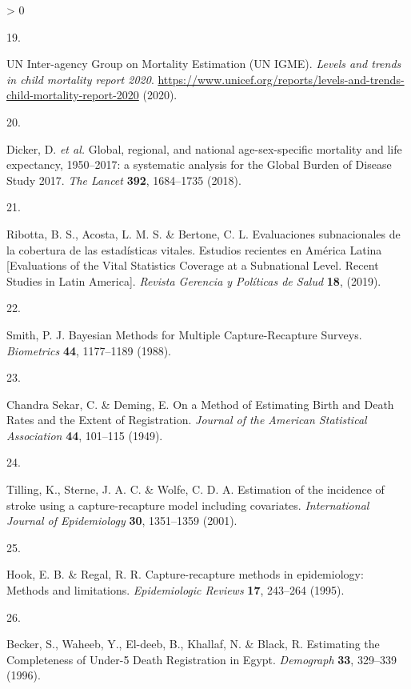 \documentclass[
]{article}
\newlength{\cslhangindent}
\newlength{\csllabelwidth}
\newenvironment{CSLReferences}[2] %
 {%
  \setlength{\parindent}{0pt}
  \ifodd #1 \everypar{\setlength{\hangindent}{\cslhangindent}}\ignorespaces\fi
  \ifnum #2 > 0
  \setlength{\parskip}{#2\baselineskip}
  \fi
 }%
 {}
\newcommand{\CSLLeftMargin}[1]{\parbox[t]{\csllabelwidth}{#1}}
\newcommand{\CSLRightInline}[1]{\parbox[t]{\linewidth - \csllabelwidth}{#1}\break}
\begin{document}
\begin{CSLReferences}{0}{0}
\leavevmode\hypertarget{ref-UNInter-agencyGrouponMortalityEstimationUNIGME2020}{}%
\CSLLeftMargin{19. }
\CSLRightInline{UN Inter-agency Group on Mortality Estimation (UN IGME). \emph{{Levels and trends in child mortality report 2020}}. \url{https://www.unicef.org/reports/levels-and-trends-child-mortality-report-2020} (2020).}

\leavevmode\hypertarget{ref-Dicker2018}{}%
\CSLLeftMargin{20. }
\CSLRightInline{Dicker, D. \emph{et al.} {Global, regional, and national age-sex-specific mortality and life expectancy, 1950--2017: a systematic analysis for the Global Burden of Disease Study 2017}. \emph{The Lancet} \textbf{392}, 1684--1735 (2018).}

\leavevmode\hypertarget{ref-Ribotta2019}{}%
\CSLLeftMargin{21. }
\CSLRightInline{Ribotta, B. S., Acosta, L. M. S. \& Bertone, C. L. {Evaluaciones subnacionales de la cobertura de las estad{í}sticas vitales. Estudios recientes en Am{é}rica Latina {[}Evaluations of the Vital Statistics Coverage at a Subnational Level. Recent Studies in Latin America{]}}. \emph{Revista Gerencia y Pol{í}ticas de Salud} \textbf{18}, (2019).}

\leavevmode\hypertarget{ref-Smith1988}{}%
\CSLLeftMargin{22. }
\CSLRightInline{Smith, P. J. {Bayesian Methods for Multiple Capture-Recapture Surveys}. \emph{Biometrics} \textbf{44}, 1177--1189 (1988).}

\leavevmode\hypertarget{ref-ChandraSekar1949}{}%
\CSLLeftMargin{23. }
\CSLRightInline{Chandra Sekar, C. \& Deming, E. {On a Method of Estimating Birth and Death Rates and the Extent of Registration}. \emph{Journal of the American Statistical Association} \textbf{44}, 101--115 (1949).}

\leavevmode\hypertarget{ref-Tilling2001a}{}%
\CSLLeftMargin{24. }
\CSLRightInline{Tilling, K., Sterne, J. A. C. \& Wolfe, C. D. A. {Estimation of the incidence of stroke using a capture-recapture model including covariates}. \emph{International Journal of Epidemiology} \textbf{30}, 1351--1359 (2001).}

\leavevmode\hypertarget{ref-Hook1995}{}%
\CSLLeftMargin{25. }
\CSLRightInline{Hook, E. B. \& Regal, R. R. {Capture-recapture methods in epidemiology: Methods and limitations}. \emph{Epidemiologic Reviews} \textbf{17}, 243--264 (1995).}

\leavevmode\hypertarget{ref-Becker1996}{}%
\CSLLeftMargin{26. }
\CSLRightInline{Becker, S., Waheeb, Y., El-deeb, B., Khallaf, N. \& Black, R. {Estimating the Completeness of Under-5 Death Registration in Egypt}. \emph{Demograph} \textbf{33}, 329--339 (1996).}


\end{CSLReferences}
\end{document}
